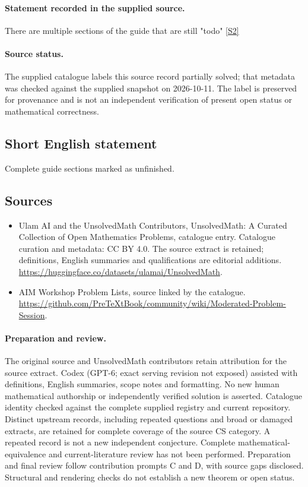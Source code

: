 \documentclass[11pt]{article}
\begin{document}
\paragraph{Statement recorded in the supplied source.}
There are multiple sections of the guide that are still "todo" \href{https://github.com/PreTeXtBook/community/wiki/Moderated-Problem-Session}{[S2]}
\paragraph{Source status.}
The supplied catalogue labels this source record partially solved; that metadata was checked against the supplied snapshot on 2026-10-11. The label is preserved for provenance and is not an independent verification of present open status or mathematical correctness.
\subsection{Short English statement}
Complete guide sections marked as unfinished.
\subsection{Sources}
\begin{itemize}
\item[S1] Ulam AI and the UnsolvedMath Contributors, UnsolvedMath: A Curated Collection of Open Mathematics Problems, catalogue entry. Catalogue curation and metadata: CC BY 4.0. The source extract is retained; definitions, English summaries and qualifications are editorial additions.
\url{https://huggingface.co/datasets/ulamai/UnsolvedMath}.
\item[S2] AIM Workshop Problem Lists, source linked by the catalogue.
\url{https://github.com/PreTeXtBook/community/wiki/Moderated-Problem-Session}.
\end{itemize}
\paragraph{Preparation and review.}
The original source and UnsolvedMath contributors retain attribution for the source extract. Codex (GPT-6; exact serving revision not exposed) assisted with definitions, English summaries, scope notes and formatting. No new human mathematical authorship or independently verified solution is asserted. Catalogue identity checked against the complete supplied registry and current repository. Distinct upstream records, including repeated questions and broad or damaged extracts, are retained for complete coverage of the source CS category. A repeated record is not a new independent conjecture. Complete mathematical-equivalence and current-literature review has not been performed. Preparation and final review follow contribution prompts C and D, with source gaps disclosed. Structural and rendering checks do not establish a new theorem or open status.
\label{end:statement}
\end{document}
